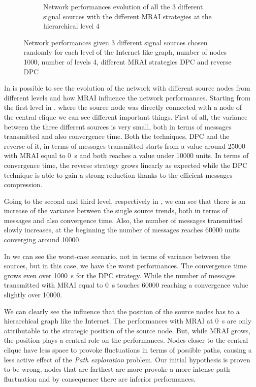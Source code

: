 \begin{figure}[h]
\begin{subfigure}[b]{0.45\textwidth}
		 \caption{Network performances evolution of all the \num{3} different signal sources
			with the different \ac{MRAI} strategies at the hierarchical level \num{4}}
         \label{fig:different_levels_4}
     \end{subfigure}
     \hfill
	 \caption{Network performances given \num{3} different signal sources chosen
		randomly for each level of the Internet like graph, number of nodes
		\num{1000}, number of levels \num{4}, different \ac{MRAI} strategies
		\ac{DPC} and reverse \ac{DPC} }
	 \label{fig:different_levels}
\end{figure}

In  is possible to see the evolution of the network
with different source nodes from different levels and how \ac{MRAI} influence
the network performances.
Starting from the first level in , where the source
node was directly connected with a node of the central clique we can see different
important things.
First of all, the variance between the three different sources is very small,
both in terms of messages transmitted and also convergence time.
Both the techniques, \ac{DPC} and the reverse of it, in terms of messages
transmitted starts from a value around \num{25000} with \ac{MRAI} equal to
\SI{0}{\second} and both reaches a value under \num{10000} units.
In terms of convergence time, the reverse strategy grows linearly as expected
while the \ac{DPC} technique is able to gain a strong reduction thanks to
the efficient messages compression.

Going to the second and third level, respectively in
, we can see that there
is an increase of the variance between the single source trends, both in terms
of messages and also convergence time.
Also, the number of messages transmitted slowly increases, at the beginning the
number of messages reaches \num{60000} units converging around \num{10000}.

In  we can see the worst-case scenario, not in
terms of variance between the sources, but in this case, we have the worst
performances.
The convergence time grows even over \SI{1000}{\second} for the \ac{DPC} strategy.
While the number of messages transmitted with \ac{MRAI} equal to \SI{0}{\second}
touches \num{60000} reaching a convergence value slightly over \num{10000}.

We can clearly see the influence that the position of the source nodes has to
a hierarchical graph like the Internet.
The performances with \ac{MRAI} at \SI{0}{\second} are only attributable to the
strategic position of the source node.
But, while \ac{MRAI} grows, the position plays a central role on the performances.
Nodes closer to the central clique have less space to provoke fluctuations
in terms of possible paths, causing a less active effect of the \textit{Path exploration}
problem.
Our initial hypothesis is proven to be wrong, nodes that are farthest are more
provoke a more intense path fluctuation and by consequence there are inferior
performances.

